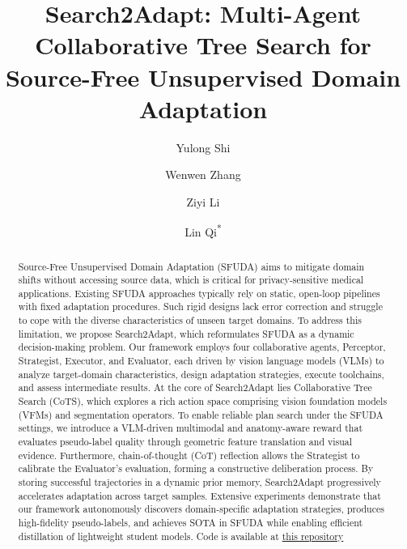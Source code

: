 \documentclass[sigconf, screen]{acmart}
\begin{document}
\title{Search2Adapt: Multi-Agent Collaborative Tree Search for Source-Free Unsupervised Domain Adaptation}

\author{Yulong Shi}

\author{Wenwen Zhang}

\author{Ziyi Li}

\author{Lin Qi\textsuperscript{*}}

\begin{abstract}
Source-Free Unsupervised Domain Adaptation (SFUDA) aims to mitigate domain shifts without accessing source data, which is critical for privacy-sensitive medical applications. Existing SFUDA approaches typically rely on static, open-loop pipelines with fixed adaptation procedures. Such rigid designs lack error correction and struggle to cope with the diverse characteristics of unseen target domains. To address this limitation, we propose Search2Adapt, which reformulates SFUDA as a dynamic decision-making problem. Our framework employs four collaborative agents, Perceptor, Strategist, Executor, and Evaluator, each driven by vision language models (VLMs) to analyze target-domain characteristics, design adaptation strategies, execute toolchains, and assess intermediate results. At the core of Search2Adapt lies Collaborative Tree Search (CoTS), which explores a rich action space comprising vision foundation models (VFMs) and segmentation operators. To enable reliable plan search under the SFUDA settings, we introduce a VLM-driven multimodal and anatomy-aware reward that evaluates pseudo-label quality through geometric feature translation and visual evidence. Furthermore, chain-of-thought (CoT) reflection allows the Strategist to calibrate the Evaluator's evaluation, forming a constructive deliberation process. By storing successful trajectories in a dynamic prior memory, Search2Adapt progressively accelerates adaptation across target samples. Extensive experiments demonstrate that our framework autonomously discovers domain-specific adaptation strategies, produces high-fidelity pseudo-labels, and achieves SOTA in SFUDA while enabling efficient distillation of lightweight student models. Code is available at \href{https://anonymous.4open.science/r/Search2Adapt-6607/}{this repository}
\end{abstract}
\end{document}
